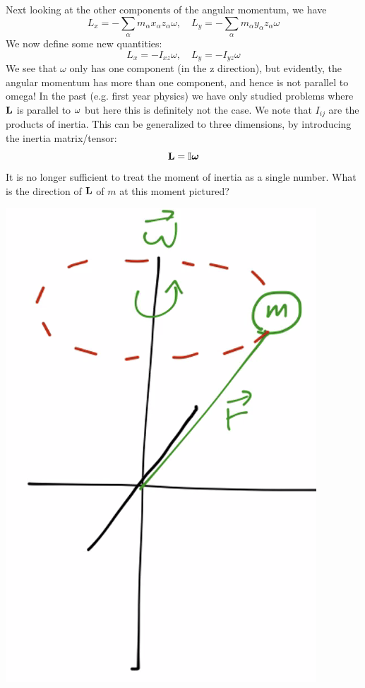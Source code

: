Next looking at the other components of the angular momentum, we have
\[L_x = -\sum_\alpha m_\alpha x_\alpha z_\alpha \omega, \quad L_y = -\sum_\alpha m_\alpha y_\alpha z_\alpha \omega\]
We now define some new quantities:
\[L_x = -I_{xz}\omega, \quad L_y = -I_{yz}\omega\]
We see that $\omega$ only has one component (in the z direction), but evidently, the angular momentum has more than one component, and hence is not parallel to omega! In the past (e.g. first year physics) we have only studied problems where $\mathbf{L}$ is parallel to $\mathbf{\omega}$ but here this is definitely not the case.
\newline We note that $I_{ij}$ are the products of inertia. This can be generalized to three dimensions, by introducing the inertia matrix/tensor:
\[\mathbf{L} = \mathbb{I}\bm{\omega}\]
It is no longer sufficient to treat the moment of inertia as a single number.
\newline What is the direction of $\mathbf{L}$ of $m$ at this moment pictured?
\begin{center}
    \includegraphics[scale=0.5]{Lecture-17/l17-img6.png}
\end{center}
